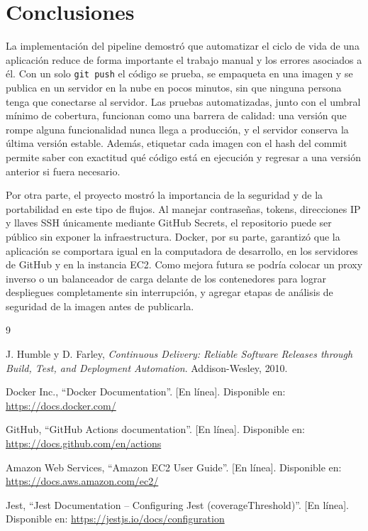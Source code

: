 \documentclass[12pt,letterpaper]{article}
\begin{document}
\section{Conclusiones}

La implementación del pipeline demostró que automatizar el ciclo de vida de una aplicación reduce de forma importante el trabajo manual y los errores asociados a él. Con un solo \texttt{git push} el código se prueba, se empaqueta en una imagen y se publica en un servidor en la nube en pocos minutos, sin que ninguna persona tenga que conectarse al servidor. Las pruebas automatizadas, junto con el umbral mínimo de cobertura, funcionan como una barrera de calidad: una versión que rompe alguna funcionalidad nunca llega a producción, y el servidor conserva la última versión estable. Además, etiquetar cada imagen con el hash del commit permite saber con exactitud qué código está en ejecución y regresar a una versión anterior si fuera necesario.

Por otra parte, el proyecto mostró la importancia de la seguridad y de la portabilidad en este tipo de flujos. Al manejar contraseñas, tokens, direcciones IP y llaves SSH únicamente mediante GitHub Secrets, el repositorio puede ser público sin exponer la infraestructura. Docker, por su parte, garantizó que la aplicación se comportara igual en la computadora de desarrollo, en los servidores de GitHub y en la instancia EC2. Como mejora futura se podría colocar un proxy inverso o un balanceador de carga delante de los contenedores para lograr despliegues completamente sin interrupción, y agregar etapas de análisis de seguridad de la imagen antes de publicarla.

\begin{thebibliography}{9}

J. Humble y D. Farley, \textit{Continuous Delivery: Reliable Software Releases through Build, Test, and Deployment Automation}. Addison-Wesley, 2010.

Docker Inc., ``Docker Documentation''. [En línea]. Disponible en: \url{https://docs.docker.com/}

GitHub, ``GitHub Actions documentation''. [En línea]. Disponible en: \url{https://docs.github.com/en/actions}

Amazon Web Services, ``Amazon EC2 User Guide''. [En línea]. Disponible en: \url{https://docs.aws.amazon.com/ec2/}

Jest, ``Jest Documentation -- Configuring Jest (coverageThreshold)''. [En línea]. Disponible en: \url{https://jestjs.io/docs/configuration}

\end{thebibliography}
\end{document}
